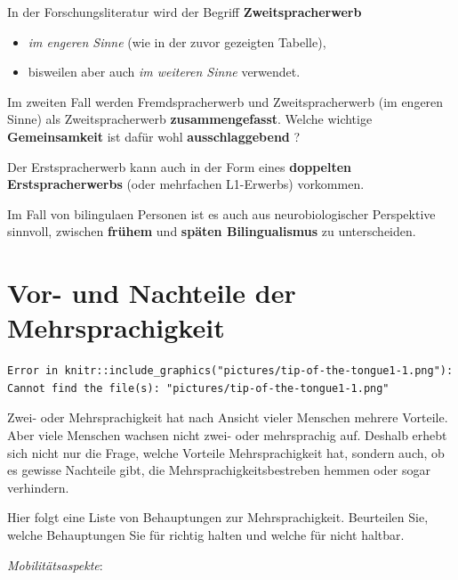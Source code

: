 \documentclass[
  letterpaper,
]{scrbook}
\begin{document}
In der Forschungsliteratur wird der Begriff \textbf{Zweitspracherwerb}

\begin{itemize}
\item
  \emph{im engeren Sinne} (wie in der zuvor gezeigten Tabelle),
\item
  bisweilen aber auch \emph{im weiteren Sinne} verwendet.
\end{itemize}

Im zweiten Fall werden Fremdspracherwerb und Zweitspracherwerb (im
engeren Sinne) als Zweitspracherwerb \textbf{zusammengefasst}. Welche
wichtige \textbf{Gemeinsamkeit} ist dafür wohl \textbf{ausschlaggebend}
?

Der Erstspracherwerb kann auch in der Form eines \textbf{doppelten
Erstspracherwerbs} (oder mehrfachen L1-Erwerbs) vorkommen.

Im Fall von bilingulaen Personen ist es auch aus neurobiologischer
Perspektive sinnvoll, zwischen \textbf{frühem} und \textbf{späten
Bilingualismus} zu unterscheiden.

\hypertarget{sec-bilingual}{%
\chapter{Vor- und Nachteile der Mehrsprachigkeit}\label{sec-bilingual}}

\begin{verbatim}
Error in knitr::include_graphics("pictures/tip-of-the-tongue1-1.png"): Cannot find the file(s): "pictures/tip-of-the-tongue1-1.png"
\end{verbatim}

Zwei- oder Mehrsprachigkeit hat nach Ansicht vieler Menschen mehrere
Vorteile. Aber viele Menschen wachsen nicht zwei- oder mehrsprachig auf.
Deshalb erhebt sich nicht nur die Frage, welche Vorteile
Mehrsprachigkeit hat, sondern auch, ob es gewisse Nachteile gibt, die
Mehrsprachigkeitsbestreben hemmen oder sogar verhindern.

Hier folgt eine Liste von Behauptungen zur Mehrsprachigkeit. Beurteilen
Sie, welche Behauptungen Sie für richtig halten und welche für nicht
haltbar.

\emph{Mobilitätsaspekte}:
\end{document}
